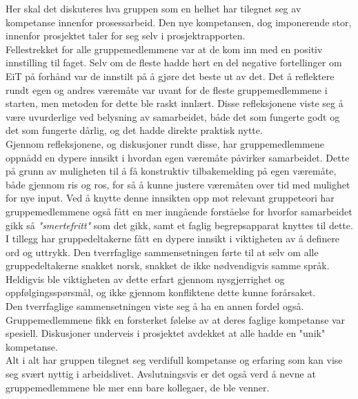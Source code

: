 Her skal det diskuteres hva gruppen som en helhet har tilegnet seg av kompetanse innenfor prosessarbeid.
Den nye kompetansen, dog imponerende stor, innenfor prosjektet taler for seg selv i prosjektrapporten. \\

Fellestrekket for alle gruppemedlemmene var at de kom inn med en positiv innstilling til faget.
Selv om de fleste hadde hørt en del negative fortellinger om EiT på forhånd var de innstilt på å gjøre det beste ut av det.
Det å reflektere rundt egen og andres væremåte var uvant for de fleste gruppemedlemmene i starten, men metoden for dette ble raskt innlært.
Disse refleksjonene viste seg å være uvurderlige ved belysning av samarbeidet, både det som fungerte godt og det som fungerte dårlig, og det hadde direkte praktisk nytte. \\

Gjennom refleksjonene, og diskusjoner rundt disse, har gruppemedlemmene oppnådd en dypere innsikt i hvordan egen væremåte påvirker samarbeidet.
Dette på grunn av muligheten til å få konstruktiv tilbakemelding på egen væremåte, både gjennom ris og ros, for så å kunne justere væremåten over tid med mulighet for nye input.
Ved å knytte denne innsikten opp mot relevant gruppeteori har gruppemedlemmene også fått en mer inngående forståelse for hvorfor samarbeidet gikk så \emph{"smertefritt"} som det gikk, samt et faglig begrepsapparat knyttes til dette. \\

I tillegg har gruppedeltakerne fått en dypere innsikt i viktigheten av å definere ord og uttrykk.
Den tverrfaglige sammensetningen førte til at selv om alle gruppedeltakerne snakket norsk, snakket de ikke nødvendigvis samme språk.
Heldigvis ble viktigheten av dette erfart gjennom nysgjerrighet og oppfølgingsspørsmål, og ikke gjennom konfliktene dette kunne forårsaket. \\

Den tverrfaglige sammensetningen viste seg å ha en annen fordel også.
Gruppemedlemmene fikk en forsterket følelse av at deres faglige kompetanse var spesiell.
Diskusjoner underveis i prosjektet avdekket at alle hadde en "unik" kompetanse. \\

Alt i alt har gruppen tilegnet seg verdifull kompetanse og erfaring som kan vise seg svært nyttig i arbeidslivet.
Avslutningsvis er det også verd å nevne at gruppemedlemmene ble mer enn bare kollegaer, de ble venner. \\
